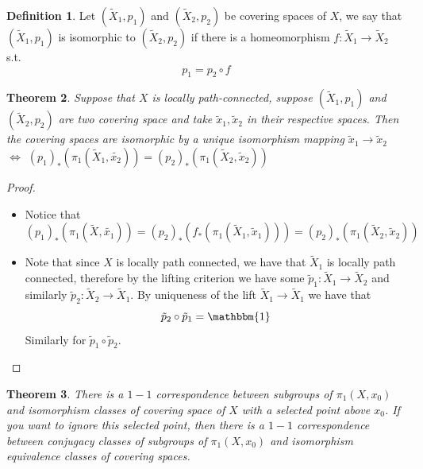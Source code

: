 \documentclass[11pt,a4paper]{article}
\theoremstyle{definition}
\newtheorem{definition}{Definition}[section]
\theoremstyle{plain}
\newtheorem{theorem}[definition]{Theorem}
\theoremstyle{remark}
\newcommand{\1}{\mathbbm{1}}
\begin{document}
\begin{definition}
    Let $(\tilde{X}_1, p_1)$ and $(\tilde{X}_2, p_2)$ be covering spaces of $X$, we say that 
    $(\tilde{X}_1, p_1)$ is isomorphic to $(\tilde{X}_2, p_2)$ if there is a homeomorphism 
    $f \colon \tilde{X}_1 \to \tilde{X}_2$ s.t. 
    $$p_1 = p_2 \circ f$$
\end{definition}

\begin{theorem}
    Suppose that $X$ is locally path-connected, suppose $(\tilde{X}_1, p_1)$ and $(\tilde{X}_2, p_2)$ are two covering space and 
    take $\tilde{x}_1, \tilde{x}_2$ in their respective spaces. Then the covering spaces are isomorphic by a unique isomorphism mapping $\tilde{x}_1 \to \tilde{x}_2$ 
    $\iff$ $(p_1)_* (\pi_1(\tilde{X}_1, \tilde{x_2})) = (p_2)_*(\pi_1(\tilde{X}_2, \tilde{x}_2))$
\end{theorem}

\begin{proof}
    \begin{itemize}
        \item[$\implies$] Notice that 
        $$(p_1)_* (\pi_1(\tilde{X}, \tilde{x_1})) = (p_2)_* (f_* (\pi_1(\tilde{X}_1, \tilde{x}_1))) = (p_2)_* (\pi_1(\tilde{X}_2, \tilde{x}_2))$$

        \item[$\impliedby$] Note that since $X$ is locally path connected, we have that $\tilde{X}_1$ is locally path connected, therefore by the lifting criterion we have some 
        $\tilde{p}_1 \colon \tilde{X}_1 \to \tilde{X}_2$ and similarly $\tilde{p}_2 \colon \tilde{X}_2 \to \tilde{X}_1$. By uniqueness of the lift $\tilde{X}_1 \to \tilde{X}_1$ we have that 
        $$\tilde{p}_2 \circ \tilde{p}_1 = \1$$
        Similarly for $\tilde{p}_1 \circ \tilde{p}_2$. 
    \end{itemize}
\end{proof}

\begin{theorem}
    There is a $1-1$ correspondence between subgroups of $\pi_1(X, x_0)$ and isomorphism classes of covering space of $X$ with a selected point above $x_0$. 
    If you want to ignore this selected point, then there is a $1-1$ correspondence between conjugacy classes of subgroups of $\pi_1(X, x_0)$ and isomorphism 
    equivalence classes of covering spaces.  
\end{theorem}
\end{document}
